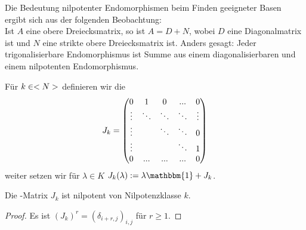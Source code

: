\begin{remark}
	Die Bedeutung nilpotenter Endomorphismen beim Finden geeigneter Basen ergibt sich aus der folgenden Beobachtung: \\
	Ist $A$ eine obere Dreiecksmatrix, so ist $A=D+N$, wobei $D$ eine Diagonalmatrix ist und $N$ eine strikte obere Dreiecksmatrix ist. Anders gesagt: Jeder trigonalisierbare Endomorphismus ist Summe aus einem diagonalisierbaren und einem nilpotenten Endomorphismus.
\end{remark}

\begin{definition}
	Für $k\in<N>$ definieren wir die 
	\begin{align}
		J_k=\begin{pmatrix}0&1&0&...&0 \\
		\vdots&\ddots&\ddots&\ddots&\vdots\\
		\vdots&\;&\ddots&\ddots&0\\
		\vdots&\;&\;&\ddots&1\\
		0&...&...&...&0\end{pmatrix}\notag
	\end{align}
	weiter setzen wir für $\lambda\in K$ $J_k(\lambda):=\lambda\mathbbm{1}+J_k$.
\end{definition}

\begin{lemma}
	Die -Matrix $J_k$ ist nilpotent von Nilpotenzklasse $k$.
\end{lemma}
\begin{proof}
	Es ist $(J_k)^r=(\delta_{i+r,j})_{i,j}$ für $r\ge 1$.
\end{proof}

